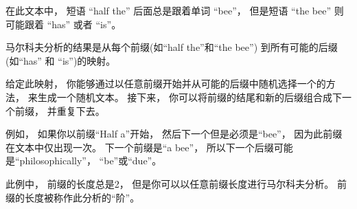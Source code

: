 
在此文本中， 短语 ``half the'' 后面总是跟着单词 ``bee''，  但是短语 ``the
bee'' 则可能跟着 ``has'' 或者  ``is''。



马尔科夫分析的结果是从每个前缀(如``half the''和``the bee'')
到所有可能的后缀(如``has'' 和 ``is'')的映射。



给定此映射， 你能够通过以任意前缀开始并从可能的后缀中随机选择一个的方法， 来生成一个随机文本。
接下来， 你可以将前缀的结尾和新的后缀组合成下一个前缀， 并重复下去。

例如， 如果你以前缀``Half a''开始， 然后下一个但是必须是``bee''，
因为此前缀在文本中仅出现一次。  下一个前缀是``a bee''，
所以下一个后缀可能是``philosophically''， ``be''或``due''。

此例中， 前缀的长度总是2， 但是你可以以任意前缀长度进行马尔科夫分析。
前缀的长度被称作此分析的“阶”。

